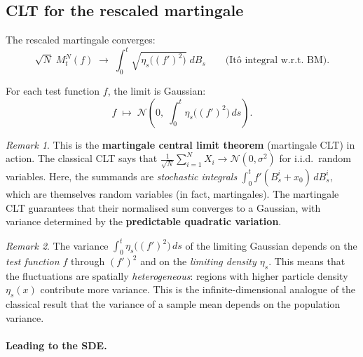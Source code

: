 \documentclass[11pt]{article}
\theoremstyle{definition}
\theoremstyle{remark}
\newtheorem{remark}{Remark}
\begin{document}
\subsection*{CLT for the rescaled martingale}


The rescaled martingale converges:
\[
    \sqrt{N}\;M_t^N(f)
    \;\longrightarrow\;
    \int_0^t \sqrt{\eta_s\!\bigl((f')^2\bigr)}\;dB_s
    \qquad \text{(Itô integral w.r.t.\ BM)}.
\]


For each test function $f$, the limit is Gaussian:
\[
    f \;\longmapsto\;
    \mathcal{N}\!\left(0,\;
    \int_0^t \eta_s\!\bigl((f')^2\bigr)\,ds
    \right).
\]

\begin{remark}
This is the \textbf{martingale central limit theorem} (martingale CLT)
in action.  The classical CLT says that
$\frac{1}{\sqrt{N}}\sum_{i=1}^N X_i \to \mathcal{N}(0, \sigma^2)$
for i.i.d.\ random variables.  Here, the summands are
\emph{stochastic integrals} $\int_0^t f'(B_s^i + x_0)\,dB_s^i$,
which are themselves random variables (in fact, martingales).
The martingale CLT guarantees that their normalised sum converges
to a Gaussian, with variance determined by the
\textbf{predictable quadratic variation}.
\end{remark}

\begin{remark}
The variance $\int_0^t \eta_s\!\bigl((f')^2\bigr)\,ds$ of the
limiting Gaussian depends on the \emph{test function $f$} through
$(f')^2$ and on the \emph{limiting density $\eta_s$}.
This means that the fluctuations are spatially
\emph{heterogeneous}: regions with higher particle density
$\eta_s(x)$ contribute more variance.  This is the
infinite-dimensional analogue of the classical result that
the variance of a sample mean depends on the population variance.
\end{remark}

\paragraph{Leading to the SDE.}
\end{document}
